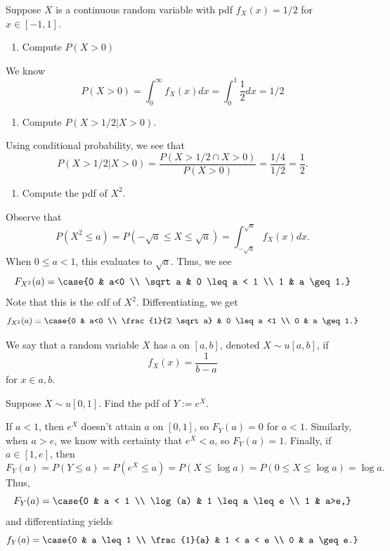 \documentclass[11pt]{article}
\begin{document}
\begin{ex}
Suppose $X$ is a continuous random variable with pdf $f_X(x)=1/2$ for $x \in [-1,1]$.
\begin{enumerate}
    \item[(i)] Compute $P(X>0)$ 
\end{enumerate}
We know
\[
P(X>0)=\int_0^\infty f_X(x)dx = \int_0^1 \frac{1}{2}dx=1/2
\]
\begin{enumerate}
    \item[(ii)] Compute $P(X>1/2 | X>0)$.
\end{enumerate}
Using conditional probability, we see that
\[
P(X>1/2 | X>0)=\frac{P(X>1/2 \cap X>0)}{P(X>0)}=\frac{1/4}{1/2}=\frac{1}{2}.
\]
\begin{enumerate}
    \item[(iii)] Compute the pdf of $X^2$.
\end{enumerate}
Observe that
\[
P(X^2\leq a)=P(-\sqrt a \leq X \leq \sqrt a)=\int_{-\sqrt a}^{\sqrt a}f_X(x)dx.
\]
When $0 \leq a < 1$, this evaluates to $\sqrt a$. Thus, we see
\[
F_{X^2}(a) = \case{0 & a<0 \\ \sqrt a & 0 \leq a < 1 \\ 1 & a \geq 1.}
\]
Note that this is the cdf of $X^2$. Differentiating, we get
\[
f_{X^2}(a) = \case{0 & a<0 \\ \frac{1}{2 \sqrt a} & 0 \leq a <1 \\ 0 & a \geq 1.}
\]
\end{ex}

\begin{defn}
    We say that a random variable $X$ has a  on $[a,b]$, denoted $X \sim u[a,b]$, if \[
    f_X(x)=\frac{1}{b-a}
    \]
    for $x \in a,b$.
\end{defn}

\begin{ex}
Suppose $X \sim u[0,1]$. Find the pdf of $Y:=e^X$.
\end{ex}

\begin{solution}
    If $a<1$, then $e^X$ doesn't attain $a$ on $[0,1]$, so $F_Y(a)=0$ for $a<1$. Similarly, when $a>e$, we know with certainty that $e^X<a$, so $F_Y(a)=1$. Finally, if $a \in [1,e]$, then
    \[
    F_Y(a)=P(Y \leq a)=P(e^X \leq a) = P(X \leq \log  a)=P(0 \leq X \leq \log a) =\log a.
    \]
    Thus,
    \[
    F_Y(a) = \case{0 & a < 1 \\ \log (a) & 1 \leq a \leq e \\ 1 & a>e,}
    \]
    and differentiating yields
    \[
    f_Y(a)= \case{0 & a \leq 1 \\ \frac{1}{a} & 1 < a < e \\ 0  & a \geq e.}
    \]
\end{solution}
\end{document}
